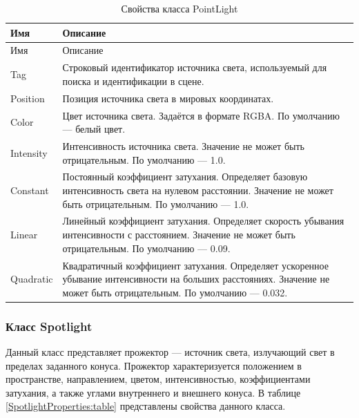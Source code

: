 \begin{xltabular}{\textwidth}{|>{\raggedright\arraybackslash}p{6cm}|>{\raggedright\arraybackslash}X|}
	\caption{Свойства класса PointLight\label{PointLightProperties:table}}\\ \hline
	\centrow Имя & \centrow Описание \\ \hline
	\endfirsthead
	\centrow Имя & \centrow Описание \\ \hline 
	\finishhead
	Tag & Строковый идентификатор источника света, используемый для поиска и идентификации в сцене. \\
	\hline
	Position & Позиция источника света в мировых координатах. \\
	\hline
	Color & Цвет источника света. Задаётся в формате RGBA. По умолчанию — белый цвет. \\
	\hline
	Intensity & Интенсивность источника света. Значение не может быть отрицательным. По умолчанию — 1.0. \\
	\hline
	Constant & Постоянный коэффициент затухания. Определяет базовую интенсивность света на нулевом расстоянии. Значение не может быть отрицательным. По умолчанию — 1.0. \\
	\hline
	Linear & Линейный коэффициент затухания. Определяет скорость убывания интенсивности с расстоянием. Значение не может быть отрицательным. По умолчанию — 0.09. \\
	\hline
	Quadratic & Квадратичный коэффициент затухания. Определяет ускоренное убывание интенсивности на больших расстояниях. Значение не может быть отрицательным. По умолчанию — 0.032.
\end{xltabular}

\subsubsection{Класс Spotlight}
Данный класс представляет прожектор — источник света, излучающий свет в пределах заданного конуса. Прожектор характеризуется положением в пространстве, направлением, цветом, интенсивностью, коэффициентами затухания, а также углами внутреннего и внешнего конуса. В таблице \ref{SpotlightProperties:table} представлены свойства данного класса.

